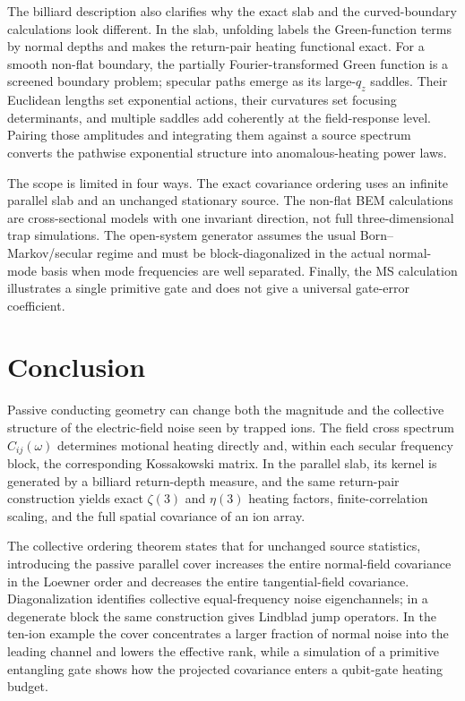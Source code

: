 \documentclass[aps,pra,twocolumn,superscriptaddress,longbibliography,nofootinbib,floatfix]{revtex4-2}
\theoremstyle{remark}
\begin{document}
The billiard description also clarifies why the exact slab and the curved-boundary calculations look different.  In the slab, unfolding labels the Green-function terms by normal depths and makes the return-pair heating functional exact.  For a smooth non-flat boundary, the partially Fourier-transformed Green function is a screened boundary problem; specular paths emerge as its large-$q_z$ saddles.  Their Euclidean lengths set exponential actions, their curvatures set focusing determinants, and multiple saddles add coherently at the field-response level.  Pairing those amplitudes and integrating them against a source spectrum converts the pathwise exponential structure into anomalous-heating power laws.

The scope is limited in four ways.  The exact covariance ordering uses an infinite parallel slab and an unchanged stationary source.  The non-flat BEM calculations are cross-sectional models with one invariant direction, not full three-dimensional trap simulations.  The open-system generator assumes the usual Born--Markov/secular regime and must be block-diagonalized in the actual normal-mode basis when mode frequencies are well separated.  Finally, the MS calculation illustrates a single primitive gate and does not give a universal gate-error coefficient.

\section{Conclusion}

Passive conducting geometry can change both the magnitude and the collective structure of the electric-field noise seen by trapped ions.  The field cross spectrum $C_{ij}(\omega)$ determines motional heating directly and, within each secular frequency block, the corresponding Kossakowski matrix.  In the parallel slab, its kernel is generated by a billiard return-depth measure, and the same return-pair construction yields exact $\zeta(3)$ and $\eta(3)$ heating factors, finite-correlation scaling, and the full spatial covariance of an ion array.

The collective ordering theorem states that for unchanged source statistics, introducing the passive parallel cover increases the entire normal-field covariance in the Loewner order and decreases the entire tangential-field covariance.  Diagonalization identifies collective equal-frequency noise eigenchannels; in a degenerate block the same construction gives Lindblad jump operators.  In the ten-ion example the cover concentrates a larger fraction of normal noise into the leading channel and lowers the effective rank, while a simulation of a primitive entangling gate shows how the projected covariance enters a qubit-gate heating budget.
\end{document}
